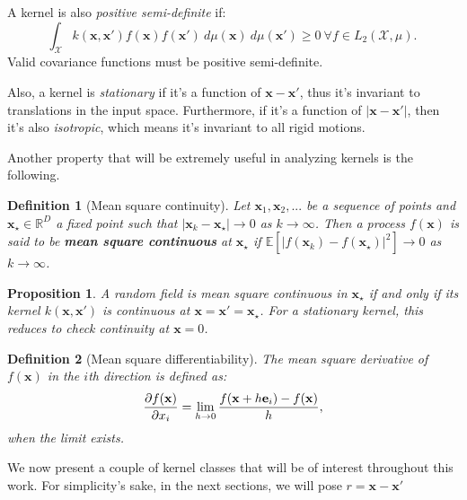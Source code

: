 \documentclass{article}
\newtheorem{prop}{Proposition}
\newtheorem{defn}{Definition}
\begin{document}
	A kernel is also \textit{positive semi-definite} if:
	\begin{equation}
		\int_\mathcal{X} k(\mathbf{x}, \mathbf{x'}) f(\mathbf{x}) f(\mathbf{x'}) \ d \mu (\mathbf{x}) \ d \mu (\mathbf{x'}) \geq 0 \ \forall f \in L_2(\mathcal{X}, \mu).\
	\end{equation}
	Valid covariance functions must be positive semi-definite.	
	
	Also, a kernel is \textit{stationary} if it's a function of $\mathbf{x} - \mathbf{x'}$, thus it's invariant to translations in the input space. Furthermore, if it's a function of $|\mathbf{x} - \mathbf{x'}|$, then it's also \textit{isotropic}, which means it's invariant to all rigid motions.
	
	Another property that will be extremely useful in analyzing kernels is the following.
	\begin{defn}[Mean square continuity]
		Let $\mathbf{x}_1, \mathbf{x}_2, ...$ be a sequence of points and $\mathbf{x}_\star \in \mathbb{R}^D$ a fixed point such that $|\mathbf{x}_k - \mathbf{x}_\star| \rightarrow 0$ as $k \rightarrow \infty$. Then a process $f(\mathbf{x})$ is said to be \textbf{mean square continuous} at $\mathbf{x}_\star$ if $\mathbb{E}[|f(\mathbf{x}_k) - f (\mathbf{x}_\star) |^2] \rightarrow 0$ as $k \rightarrow \infty$.
	\end{defn}
	
	\begin{prop}
		A random field is mean square continuous in $\mathbf{x}_\star$ if and only if its kernel $k(\mathbf{x}, \mathbf{x'})$ is continuous at $\mathbf{x} = \mathbf{x'} = \mathbf{x}_\star$. For a stationary kernel, this reduces to check continuity at $\mathbf{x} = 0$.
	\end{prop}
	
	\begin{defn}[Mean square differentiability]
		The mean square derivative of $f(\mathbf{x})$ in the $i$th direction is defined as:
		\begin{equation}
			{\partial f(\mathbf{x}) \over \partial x_i} = \lim_{h \rightarrow 0} {f(\mathbf{x} + h \mathbf{e}_i) - f(\mathbf{x}) \over h},
		\end{equation}
		when the limit exists.
	\end{defn}
	
	We now present a couple of kernel classes that will be of interest throughout this work. For simplicity's sake, in the next sections, we will pose $r = \mathbf{x} - \mathbf{x'}$
	
\end{document}

